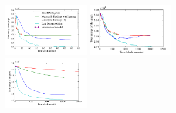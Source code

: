 \documentclass[letterpaper, 10 pt, conference]{ieeeconf} %
\begin{document}
\providecommand{\mysubfloatwidth}{0.33\textwidth}
\begin{figure}
  \includegraphics[width=\mysubfloatwidth]{../../Data/cave_player/plot-time-energy.pdf}%
  \includegraphics[width=\mysubfloatwidth]{../../Data/hospital_section_player/plot-time-energy.pdf}%
  \includegraphics[width=\mysubfloatwidth]{../../Data/albertb.sm/plot-time-energy.pdf}%

\end{figure}
\end{document}
